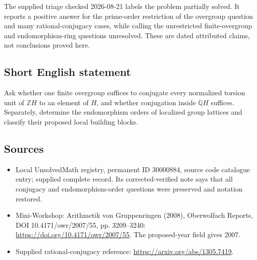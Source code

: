 \documentclass[11pt]{article}
\newcommand{\Z}{\mathbb{Z}}
\newcommand{\Q}{\mathbb{Q}}
\begin{document}
The supplied triage checked 2026-08-21 labels the problem partially solved. It reports a positive answer for the prime-order restriction of the overgroup question and many rational-conjugacy cases, while calling the unrestricted finite-overgroup and endomorphism-ring questions unresolved. These are dated attributed claims, not conclusions proved here.
\subsection{Short English statement}
Ask whether one finite overgroup suffices to conjugate every normalized torsion unit of $\Z H$ to an element of $H$, and whether conjugation inside $\Q H$ suffices. Separately, determine the endomorphism orders of localized group lattices and classify their proposed local building blocks.
\subsection{Sources}
\begin{itemize}
\item Local UnsolvedMath registry, permanent ID 30000884, source code catalogue entry; supplied complete record. Its corrected-verified note says that all conjugacy and endomorphism-order questions were preserved and notation restored.
\item Mini-Workshop: Arithmetik von Gruppenringen (2008), Oberwolfach Reports, DOI 10.4171/owr/2007/55, pp. 3209--3240: \url{https://doi.org/10.4171/owr/2007/55}. The proposed-year field gives 2007.
\item Supplied rational-conjugacy reference: \url{https://arxiv.org/abs/1305.7419}.
\end{itemize}
\end{document}
